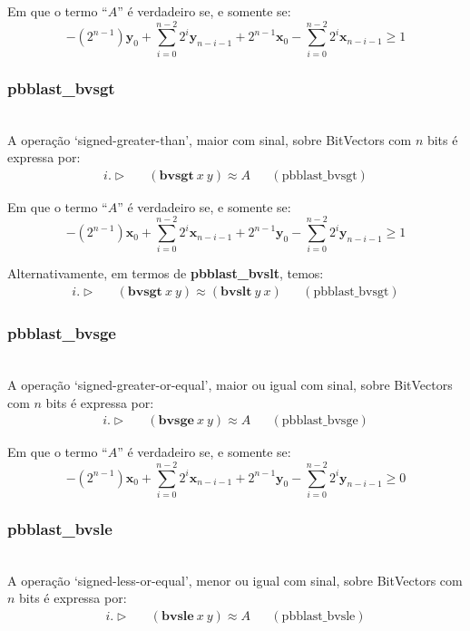 \documentclass[conference]{IEEEtran}
\begin{document}
Em que o termo ``$A$'' é verdadeiro se, e somente se:
\[
    -(2^{n-1})\mathbf{y}_0 + \sum_{i=0}^{n-2} 2^i\mathbf{y}_{n-i-1} + 2^{n-1} \mathbf{x}_{0} - \sum_{i=0}^{n-2} 2^i\mathbf{x}_{n-i-1} \geq 1
\]

\subsubsection{\textbf{pbblast\_bvsgt}}
\noindent\\
A operação `signed-greater-than', maior com sinal, sobre BitVectors com $n$ bits é expressa por:
\begin{align*}
    i. \vartriangleright &  & (\textbf{bvsgt}\ x\ y) \approx A &  & (\text{pbblast\_bvsgt})
\end{align*}

Em que o termo ``$A$'' é verdadeiro se, e somente se:
\[
    -(2^{n-1})\mathbf{x}_0 + \sum_{i=0}^{n-2} 2^i\mathbf{x}_{n-i-1} + 2^{n-1} \mathbf{y}_{0} - \sum_{i=0}^{n-2} 2^i\mathbf{y}_{n-i-1} \geq 1
\]

Alternativamente, em termos de \textbf{pbblast\_bvslt}, temos:
\begin{align*}
    i. \vartriangleright &  & (\textbf{bvsgt}\ x\ y) \approx (\textbf{bvslt}\ y\ x) &  & (\text{pbblast\_bvsgt})
\end{align*}

\subsubsection{\textbf{pbblast\_bvsge}}
\noindent\\
A operação `signed-greater-or-equal', maior ou igual com sinal, sobre BitVectors com $n$ bits é expressa por:
\begin{align*}
    i. \vartriangleright &  & (\textbf{bvsge}\ x\ y) \approx A &  & (\text{pbblast\_bvsge})
\end{align*}

Em que o termo ``$A$'' é verdadeiro se, e somente se:
\[
    -(2^{n-1})\mathbf{x}_{0} + \sum_{i=0}^{n-2} 2^i\mathbf{x}_{n-i-1} + 2^{n-1}\mathbf{y}_{0} - \sum_{i=0}^{n-2} 2^i\mathbf{y}_{n-i-1} \geq 0
\]

\subsubsection{\textbf{pbblast\_bvsle}}
\noindent\\
A operação `signed-less-or-equal', menor ou igual com sinal, sobre BitVectors com $n$ bits é expressa por:
\begin{align*}
    i. \vartriangleright &  & (\textbf{bvsle}\ x\ y) \approx A &  & (\text{pbblast\_bvsle})
\end{align*}
\end{document}
